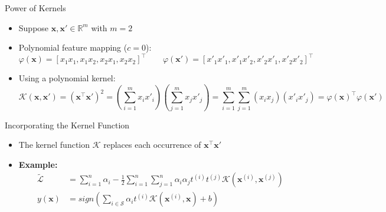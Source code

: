 \begin{frame}{Power of Kernels}{}
	\begin{itemize}
		\item Suppose $\bm{x}, \bm{x'} \in \mathbb{R}^m$ with $m = 2$
		\item Polynomial feature mapping ($c = 0$):
		\vspace*{-1.5mm}
		\begin{equation}
			\varphi(\bm{x}) = [x_1 x_1, x_1 x_2, x_2 x_1, x_2 x_2]^{\intercal} \qquad
			\varphi(\bm{x'}) = [x'_1 x'_1, x'_1 x'_2, x'_2 x'_1, x'_2 x'_2]^{\intercal}
		\end{equation}
		\item Using a polynomial kernel:
		{\scriptsize
		\begin{equation}
			\mathcal{K}(\bm{x}, \bm{x'}) 
				= (\bm{x}^{\intercal} \bm{x'})^2
				= \left( \sum_{i=1}^m x_i x'_i \right) \left( \sum_{j=1}^m x_j x'_j \right)
				= \sum_{i=1}^m \sum_{j=1}^m (x_i x_j) (x'_i x'_j) = \varphi(\bm{x})^{\intercal} \varphi(\bm{x'})
		\end{equation}}
		\vspace*{-2mm}
		\begin{boxBlueNoFrame}
			\footnotesize
		\end{boxBlueNoFrame}
	\end{itemize}
\end{frame}


\begin{frame}{Incorporating the Kernel Function}{}
	\begin{itemize}
		\item The kernel function $\mathcal{K}$ replaces each occurrence of $\bm{x}^{\intercal}\bm{x'}$
		\item \textbf{Example:}
		\begin{align}
			\widetilde{\mathcal{L}} 
					&= \sum_{i=1}^n \alpha_i  - \frac{1}{2} \sum_{i=1}^n \sum_{j=1}^n
						\alpha_i \alpha_j t^{(i)} t^{(j)} \mathcal{K}(\bm{x}^{(i)}, \bm{x}^{(j)}) \\[4mm]
			y(\bm{x}) 	&= sign \left( \sum_{i \in \mathcal{S}} \alpha_i t^{(i)} \mathcal{K}(\bm{x}^{(i)}, \bm{x}) + b \right)
		\end{align}
	\end{itemize}
\end{frame}


